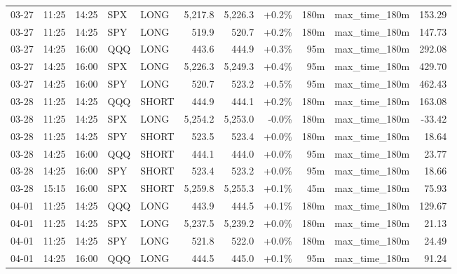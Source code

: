 \documentclass[11pt,a4paper,twoside]{article}
\begin{document}
\begin{center}
\begin{longtable}{>{\color{txtmain}}l l l l l r r r r >{\color{txtmain}}l r}
03-27 & 11:25 & 14:25 & SPX & LONG & 5,217.8 & 5,226.3 & \textcolor{wingreen}{+0.2\%} & 180m & max\_time\_180m & \textcolor{wingreen}{153.29} \\
03-27 & 11:25 & 14:25 & SPY & LONG & 519.9 & 520.7 & \textcolor{wingreen}{+0.2\%} & 180m & max\_time\_180m & \textcolor{wingreen}{147.73} \\
03-27 & 14:25 & 16:00 & QQQ & LONG & 443.6 & 444.9 & \textcolor{wingreen}{+0.3\%} & 95m & max\_time\_180m & \textcolor{wingreen}{292.08} \\
03-27 & 14:25 & 16:00 & SPX & LONG & 5,226.3 & 5,249.3 & \textcolor{wingreen}{+0.4\%} & 95m & max\_time\_180m & \textcolor{wingreen}{429.70} \\
03-27 & 14:25 & 16:00 & SPY & LONG & 520.7 & 523.2 & \textcolor{wingreen}{+0.5\%} & 95m & max\_time\_180m & \textcolor{wingreen}{462.43} \\
03-28 & 11:25 & 14:25 & QQQ & SHORT & 444.9 & 444.1 & \textcolor{wingreen}{+0.2\%} & 180m & max\_time\_180m & \textcolor{wingreen}{163.08} \\
03-28 & 11:25 & 14:25 & SPX & LONG & 5,254.2 & 5,253.0 & \textcolor{lossred}{-0.0\%} & 180m & max\_time\_180m & \textcolor{lossred}{-33.42} \\
03-28 & 11:25 & 14:25 & SPY & SHORT & 523.5 & 523.4 & \textcolor{wingreen}{+0.0\%} & 180m & max\_time\_180m & \textcolor{wingreen}{18.64} \\
03-28 & 14:25 & 16:00 & QQQ & SHORT & 444.1 & 444.0 & \textcolor{wingreen}{+0.0\%} & 95m & max\_time\_180m & \textcolor{wingreen}{23.77} \\
03-28 & 14:25 & 16:00 & SPY & SHORT & 523.4 & 523.2 & \textcolor{wingreen}{+0.0\%} & 95m & max\_time\_180m & \textcolor{wingreen}{18.66} \\
03-28 & 15:15 & 16:00 & SPX & SHORT & 5,259.8 & 5,255.3 & \textcolor{wingreen}{+0.1\%} & 45m & max\_time\_180m & \textcolor{wingreen}{75.93} \\
04-01 & 11:25 & 14:25 & QQQ & LONG & 443.9 & 444.5 & \textcolor{wingreen}{+0.1\%} & 180m & max\_time\_180m & \textcolor{wingreen}{129.67} \\
04-01 & 11:25 & 14:25 & SPX & LONG & 5,237.5 & 5,239.2 & \textcolor{wingreen}{+0.0\%} & 180m & max\_time\_180m & \textcolor{wingreen}{21.13} \\
04-01 & 11:25 & 14:25 & SPY & LONG & 521.8 & 522.0 & \textcolor{wingreen}{+0.0\%} & 180m & max\_time\_180m & \textcolor{wingreen}{24.49} \\
04-01 & 14:25 & 16:00 & QQQ & LONG & 444.5 & 445.0 & \textcolor{wingreen}{+0.1\%} & 95m & max\_time\_180m & \textcolor{wingreen}{91.24} \\

\end{longtable}
\end{center}
\end{document}

